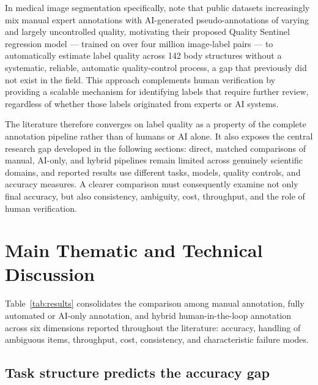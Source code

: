 \documentclass[acmsmall,nonacm]{acmart}
\begin{document}
In medical image segmentation specifically, \citet*{chen2024quality} note that public datasets increasingly mix manual expert annotations with AI-generated pseudo-annotations of varying and largely uncontrolled quality, motivating their proposed Quality Sentinel regression model --- trained on over four million image-label pairs --- to automatically estimate label quality across 142 body structures without a systematic, reliable, automatic quality-control process, a gap that previously did not exist in the field. This approach complements human verification by providing a scalable mechanism for identifying labels that require further review, regardless of whether those labels originated from experts or AI systems.

The literature therefore converges on label quality as a property of the complete annotation pipeline rather than of humans or AI alone. It also exposes the central research gap developed in the following sections: direct, matched comparisons of manual, AI-only, and hybrid pipelines remain limited across genuinely scientific domains, and reported results use different tasks, models, quality controls, and accuracy measures. A clearer comparison must consequently examine not only final accuracy, but also consistency, ambiguity, cost, throughput, and the role of human verification.

\section{Main Thematic and Technical Discussion}
\label{sec:main-discussion}

Table~\ref{tab:results} consolidates the comparison among manual annotation, fully automated or AI-only annotation, and hybrid human-in-the-loop annotation across six dimensions reported throughout the literature: accuracy, handling of ambiguous items, throughput, cost, consistency, and characteristic failure modes.

\subsection{Task structure predicts the accuracy gap}
\label{subsec:task-structure}
\end{document}
